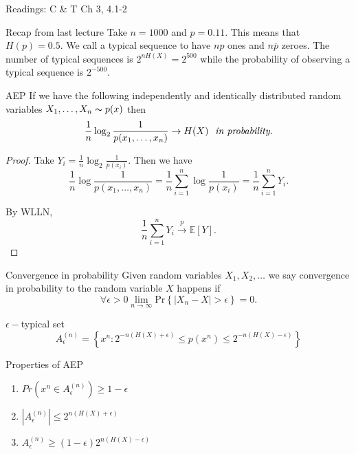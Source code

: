 
Readings: C \& T Ch 3, 4.1-2

\begin{exmp}{Recap from last lecture}{}
Take \(n = 1000\) and \(p = 0.11\). This means that \(H(p) = 0.5\). We call a typical sequence to have \(np\) ones and \(n \overline{p} \) zeroes. The number of typical sequences is \(2^{nH(X)} = 2^{500} \) while the probability of observing a typical sequence is \(2^{- 500} \). 
\end{exmp}

\begin{thrm}{AEP}{}
If we have the following independently and identically distributed random variables \(X_1, \dots , X_{n}  \thicksim p(x)\) then
\[
    \frac{1}{n}\log _2 \frac{1}{p(x_1,\dots , x_n)} \to H(X) \text{ \textit{ in probability.}} 
\]

\tcbline

\begin{proof}

Take \(Y_{i} = \frac{1}{n}\log _2 \frac{1}{p(x_{i} )}\). Then we have 
\[
    \frac{1}{n}\log  \frac{1}{p(x_1,\dots ,x_n)} = \frac{1}{n}\sum_{i = 1}^{n} \log \frac{1}{p(x_{i} )} = \frac{1}{n} \sum_{i = 1}^{n} Y_{i}.    
\]

By WLLN,
\[
    \frac{1}{n}\sum_{i = 1}^{n} Y_{i} \overset{p}{\to} \mathbb{E} [Y] .
\]
\end{proof}

\end{thrm}

\begin{defn}{Convergence in probability}{}
Given random variables \(X_1,X_2, \dots  \) we say convergence in probability to the random variable \(X\) happens if 
\[
    \forall \epsilon > 0 \lim_{n \to \infty} \mathrm{Pr} \left\{ |X_{n} - X| > \epsilon  \right\} = 0.
\]
\end{defn}

\begin{exmp}{\(\epsilon -\)typical set   }{}
\[
    A_{\epsilon }^{(n)} = \left\{ x^n : 2^{- n(H(X) + \epsilon )} \leq p(x^n) \leq 2^{- n(H(X) - \epsilon )} \right\} 
\]
\end{exmp}

\begin{misc}{Properties of AEP}{}
\begin{enumerate}
    \item \(Pr(x^n \in A_{\epsilon }^{(n)} ) \geq 1 - \epsilon \) 
    \item \(\left\lvert A_{\epsilon }^{(n) } \right\rvert \leq 2^{n(H(X) + \epsilon )} \) 
    \item \(A_{\epsilon }^{(n)} \geq (1 - \epsilon )2^{n(H(X) - \epsilon )} \) 
\end{enumerate}
\end{misc}

